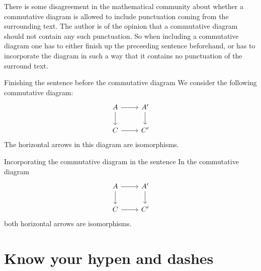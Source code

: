 There is some disagreement in the mathematical community about whether a commutative diagram is allowed to include punctuation coming from the surrounding text.
The author is of the opinion that a commutative diagram should not contain any such punctuation.
So when including a commutative diagram one has to either finish up the preceeding sentence beforehand, or has to incorporate the diagram in such a way that it contains no punctuation of the surround text.
\begin{showlatex}{Finishing the sentence before the commutative diagram}
  We consider the following commutative diagram:
  \[
    \begin{tikzcd}
        A
        \arrow{r}
        \arrow{d}
      &
        A'
        \arrow{d}
      \\
        C
        \arrow{r}
      &
        C'  
    \end{tikzcd}
  \]
  The horizontal arrows in this diagram are isomorphisms.
\end{showlatex}
\begin{showlatex}{Incorporating the commutative diagram in the sentence}
  In the commutative diagram
    \[
    \begin{tikzcd}
        A
        \arrow{r}
        \arrow{d}
      &
        A'
        \arrow{d}
      \\
        C
        \arrow{r}
      &
        C'  
    \end{tikzcd}
  \]
  both horizontal arrows are isomorphisms.
\end{showlatex}





\section{Know your hypen and dashes}

